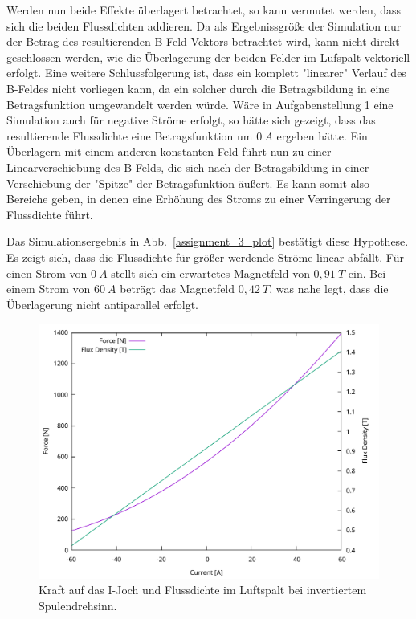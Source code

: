 \documentclass[conference,a4paper,twoside]{IEEEtran}
\begin{document}
Werden nun beide Effekte überlagert betrachtet, so kann vermutet werden, dass sich die beiden Flussdichten addieren. Da als Ergebnissgröße der Simulation nur der Betrag des resultierenden B-Feld-Vektors betrachtet wird, kann nicht direkt geschlossen werden, wie die Überlagerung der beiden Felder im Lufspalt vektoriell erfolgt. Eine weitere Schlussfolgerung ist, dass ein komplett "linearer" Verlauf des B-Feldes nicht vorliegen kann, da ein solcher durch die Betragsbildung in eine Betragsfunktion umgewandelt werden würde. Wäre in Aufgabenstellung 1 eine Simulation auch für negative Ströme erfolgt, so hätte sich gezeigt, dass das resultierende Flussdichte eine Betragsfunktion um $0\ A$ ergeben hätte. Ein Überlagern mit einem anderen konstanten Feld führt nun zu einer Linearverschiebung des B-Felds, die sich nach der Betragsbildung in einer Verschiebung der "Spitze" der Betragsfunktion äußert. Es kann somit also Bereiche geben, in denen eine Erhöhung des Stroms zu einer Verringerung der Flussdichte führt.

Das Simulationsergebnis in Abb.~\ref{assignment_3_plot} bestätigt diese Hypothese. Es zeigt sich, dass die Flussdichte für größer werdende Ströme linear abfällt. Für einen Strom von $0\ A$ stellt sich ein erwartetes Magnetfeld von $0,91\ T$ ein. Bei einem Strom von $60\ A$ beträgt das Magnetfeld $0,42\ T$, was nahe legt, dass die Überlagerung nicht antiparallel erfolgt.

\begin{figure}
\centerline{\includegraphics[width=\columnwidth]{../assets/assignment_3_plot_swapped_polarity.pdf}}
\caption{Kraft auf das I-Joch und Flussdichte im Luftspalt bei invertiertem Spulendrehsinn.}
\label{assignment_3_plot_swapped_polarity}
\end{figure}
\end{document}
